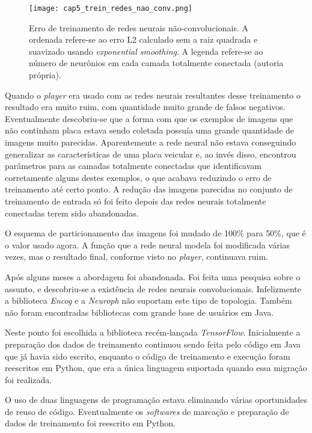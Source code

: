 \begin{figure}[!htb]
	\centering
	\texttt{[image: cap5\_trein\_redes\_nao\_conv.png]}
	\caption[Erro de treinamento de redes neurais não-convolucionais]{
		Erro de treinamento de redes neurais não-convolucionais.
		A ordenada refere-se ao erro L2 calculado sem a raiz quadrada e suavizado
		usando \emph{exponential smoothing}. A legenda refere-se ao número de
		neurônios em cada camada totalmente conectada (autoria própria).}
	\label{fig:cap5_trein_redes_nao_conv}
\end{figure}

Quando o \emph{player} era usado com as redes neurais resultantes
desse treinamento o
resultado era muito ruim, com quantidade muito grande de falsos negativos.
Eventualmente descobriu-se que a forma com que os exemplos de imagens que não
continham placa estava sendo coletada possuía uma grande quantidade de imagens
muito parecidas. Aparentemente a rede neural não estava conseguindo generalizar
as características de uma placa veicular e, ao invés disso, encontrou
parâmetros para as camadas totalmente conectadas que identificavam corretamente
alguns destes exemplos, o que acabava reduzindo o erro de treinamento até certo
ponto. A redução das imagens parecidas no conjunto de treinamento de entrada só
foi feito depois das redes neurais totalmente conectadas terem sido
abandonadas.

O esquema de particionamento das imagens foi mudado de 100\% para 50\%, que é o
valor usado agora. A função que a rede neural modela foi modificada
várias vezes, mas o resultado final, conforme visto no \emph{player},
continuava ruim.

Após alguns meses a abordagem foi abandonada. Foi feita uma pesquisa sobre o
assunto, e descobriu-se a existência de redes neurais convolucionais.
Infelizmente
a biblioteca \emph{Encog} e a \emph{Neuroph} não suportam este tipo de
topologia. Também não foram encontradas bibliotecas com grande base de
usuários em Java.

Neste ponto foi escolhida a biblioteca recém-lançada \emph{TensorFlow}.
Inicialmente a
preparação dos dados de treinamento continuou sendo feita pelo código em Java
que já havia sido escrito, enquanto o código de treinamento e execução foram
reescritos em Python, que era a única linguagem suportada quando essa
migração foi realizada.

O uso de duas linguagens de programação estava eliminando várias oportunidades
de reuso de código. Eventualmente os \emph{softwares} de marcação e preparação
de dados de treinamento foi reescrito em Python.

